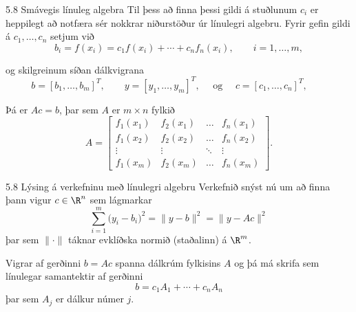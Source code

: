 \begin{frame}{5.8 Smávegis línuleg algebra} 
Til þess að finna þessi gildi á stuðlunum $c_i$ er heppilegt að
notfæra sér nokkrar niðurstöður úr línulegri algebru. Fyrir gefin
gildi á $c_1,\dots,c_n$ setjum við  
\begin{equation*}
	b_i = f(x_i) = c_1f(x_i) + \cdots + c_n f_n(x_i), 
	\qquad i=1,\dots,m,
\end{equation*}

\pause
og skilgreinum síðan dálkvigrana
\begin{equation*}
	b = [b_1,\dots,b_m]^T,\qquad 
	y = [y_1,\dots,y_m]^T,\quad \text{ og } \quad 
	c = [c_1,\dots,c_n]^T,\qquad 
\end{equation*}

\pause
Þá er $Ac=b$, þar sem $A$ er $m\times n$ fylkið
\begin{equation*}
	A = \left[\begin{matrix} 
		f_1(x_1)& f_2(x_1) & \dots & f_n(x_1) \\ 
		f_1(x_2)& f_2(x_2) & \dots & f_n(x_2) \\
		\vdots &\vdots &\ddots &\vdots \\
		f_1(x_m)& f_2(x_m) & \dots & f_n(x_m)
	\end{matrix}\right].
\end{equation*}
\end{frame}

\begin{frame}{5.8 Lýsing á verkefninu með línulegri algebru} 
Verkefnið snýst nú um að finna þann vigur $c\in \R^n$ sem lágmarkar
\begin{equation*}
	\sum_{i=1}^m \big(y_i-b_i\big)^2
	= \| y - b \|^2 = \| y - Ac \|^2
\end{equation*}
þar sem $\|\cdot\|$ táknar evklíðska normið (staðalinn) á $\R^m$.

\pause
\smallskip
Vigrar af gerðinni $b= Ac$ spanna dálkrúm fylkisins 
$A$ og þá má skrifa sem línulegar samantektir af gerðinni
\begin{equation*}
	b = c_1A_1 + \cdots + c_nA_n
\end{equation*}
þar sem $A_j$ er dálkur númer $j$.
\end{frame}

